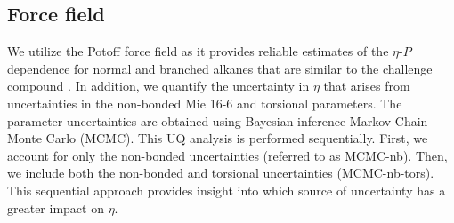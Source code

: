 \documentclass[preprint,review,12pt]{elsarticle}
\begin{document}
		\subsection{Force field} \label{Force Field}
	
	We utilize the Potoff force field as it provides reliable estimates of the $\eta$-$P$ dependence for normal and branched alkanes that are similar to the challenge compound \cite{Postdoc_3}. In addition, we quantify the uncertainty in $\eta$ that arises from uncertainties in the non-bonded Mie 16-6 and torsional parameters. The parameter uncertainties are obtained using Bayesian inference Markov Chain Monte Carlo (MCMC). This UQ analysis is performed sequentially. First, we account for only the non-bonded uncertainties (referred to as MCMC-nb). Then, we include both the non-bonded and torsional uncertainties (MCMC-nb-tors). This sequential approach provides insight into which source of uncertainty has a greater impact on $\eta$.
	
	
	
	
\end{document}
